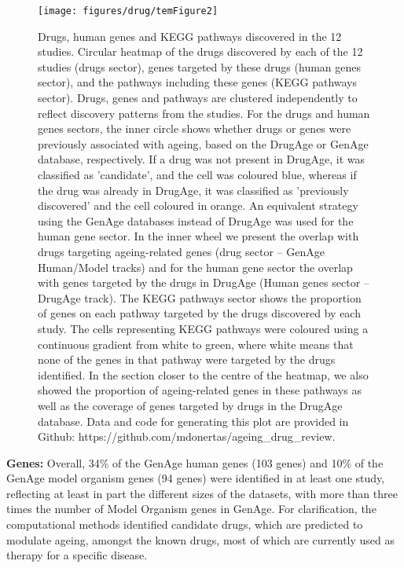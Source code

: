 \documentclass[12pt,twoside]{unicam}
\begin{document}
\begin{figure}

{\centering \texttt{[image: figures/drug/temFigure2]} 

}

\caption[Drugs, human genes and KEGG pathways discovered in the published drug-repurposing studies.]{Drugs, human genes and KEGG pathways discovered in the 12 studies. Circular heatmap of the drugs discovered by each of the 12 studies (drugs sector), genes targeted by these drugs (human genes sector), and the pathways including these genes (KEGG pathways sector). Drugs, genes and pathways are clustered independently to reflect discovery patterns from the studies. For the drugs and human genes sectors, the inner circle shows whether drugs or genes were previously associated with ageing, based on the DrugAge or GenAge database, respectively. If a drug was not present in DrugAge, it was classified as 'candidate', and the cell was coloured blue, whereas if the drug was already in DrugAge, it was classified as 'previously discovered' and the cell coloured in orange. An equivalent strategy using the GenAge databases instead of DrugAge was used for the human gene sector. In the inner wheel we present the overlap with drugs targeting ageing-related genes (drug sector – GenAge Human/Model tracks) and for the human gene sector the overlap with genes targeted by the drugs in DrugAge (Human genes sector – DrugAge track). The KEGG pathways sector shows the proportion of genes on each pathway targeted by the drugs discovered by each study. The cells representing KEGG pathways were coloured using a continuous gradient from white to green, where white means that none of the genes in that pathway were targeted by the drugs identified. In the section closer to the centre of the heatmap, we also showed the proportion of ageing-related genes in these pathways as well as the coverage of genes targeted by drugs in the DrugAge database. Data and code for generating this plot are provided in Github: https://github.com/mdonertas/ageing\_drug\_review.}\label{fig:temrevFig2}
\end{figure}

\textbf{Genes:} Overall, 34\% of the GenAge human genes (103 genes) and 10\% of the GenAge model organism genes (94 genes) were identified in at least one study, reflecting at least in part the different sizes of the datasets, with more than three times the number of Model Organism genes in GenAge. For clarification, the computational methods identified candidate drugs, which are predicted to modulate ageing, amongst the known drugs, most of which are currently used as therapy for a specific disease.
\end{document}
